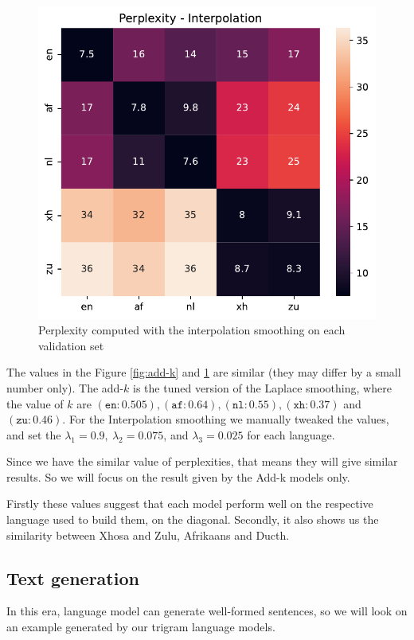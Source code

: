 \begin{figure}[H]
	\centering
	\includegraphics[width=0.5\linewidth]{./figures/inter.pdf}
	\caption{Perplexity computed with the interpolation smoothing on each validation set}
	\label{fig:interp}
\end{figure}
The values in the Figure \ref{fig:add-k} and \ref{fig:interp} are  similar (they may differ by a small number only).
The add-$k$ is the tuned version of the Laplace smoothing, where the value of $k$ are
$(\mathtt{en}: 0.505),
	(\mathtt{af}: 0.64),
	(\mathtt{nl}: 0.55),
	(\mathtt{xh}: 0.37)$ and
	$(\mathtt{zu}: 0.46)$. For the Interpolation smoothing we manually tweaked the values, and set the $\lambda_1=0.9,\ \lambda_2=0.075$, and $\lambda_3 = 0.025$ for each language.

Since we have the similar value of perplexities, that means they will give similar results. So we will focus on the result given by the Add-k models only.


Firstly these values suggest that each model perform well on the respective language used to build them, on the diagonal. Secondly, it also shows us the similarity between Xhosa and Zulu, Afrikaans and Ducth.

\subsection{Text generation}
In this era, language model can generate well-formed sentences, so we will look on an example generated by our trigram language models.

